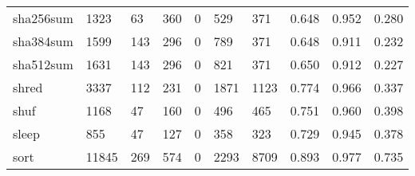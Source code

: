 \begin{longtable}{lp{1.3cm}p{1.3cm}p{1.3cm}p{1.3cm}p{1.3cm}p{1.3cm}p{1.3cm}p{1.3cm}p{1.3cm}}
sha256sum &                   1323 &                                 63 &                               360 &                                0 &                               529 &                             371 &                                   0.648 &                                  0.952 &                                0.280 \\
sha384sum &                   1599 &                                143 &                               296 &                                0 &                               789 &                             371 &                                   0.648 &                                  0.911 &                                0.232 \\
sha512sum &                   1631 &                                143 &                               296 &                                0 &                               821 &                             371 &                                   0.650 &                                  0.912 &                                0.227 \\
shred     &                   3337 &                                112 &                               231 &                                0 &                              1871 &                            1123 &                                   0.774 &                                  0.966 &                                0.337 \\
shuf      &                   1168 &                                 47 &                               160 &                                0 &                               496 &                             465 &                                   0.751 &                                  0.960 &                                0.398 \\
sleep     &                    855 &                                 47 &                               127 &                                0 &                               358 &                             323 &                                   0.729 &                                  0.945 &                                0.378 \\
sort      &                  11845 &                                269 &                               574 &                                0 &                              2293 &                            8709 &                                   0.893 &                                  0.977 &                                0.735 \\

\end{longtable}
